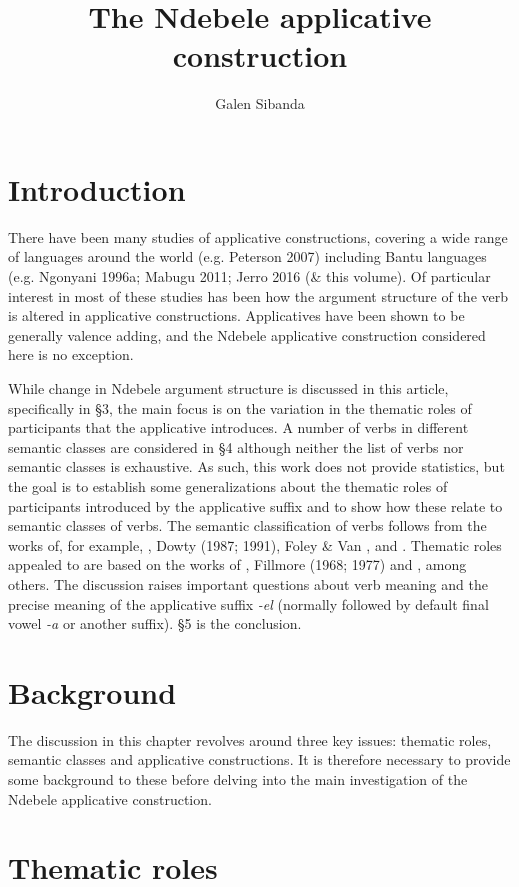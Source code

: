 \documentclass[output=paper]{langsci/langscibook}
\title{The Ndebele applicative construction}
\author{%
 Galen Sibanda \affiliation{Michigan State University} 
}
\begin{document}
\section {Introduction}

There have been many studies of applicative constructions, covering a wide range of languages around the world (e.g. Peterson 2007) including Bantu languages (e.g. Ngonyani 1996a; Mabugu 2011; Jerro 2016 (\& this volume). Of particular interest in most of these studies has been how the argument structure of the verb is altered in applicative constructions. Applicatives have been shown to be generally valence adding, and the Ndebele applicative construction considered here is no exception. 

 While change in Ndebele argument structure is discussed in this article, specifically in §3, the main focus is on the variation in the thematic roles of participants that the applicative introduces. A number of verbs in different semantic classes are considered in §4 although neither the list of verbs nor semantic classes is exhaustive. As such, this work does not provide statistics, but the goal is to establish some generalizations about the thematic roles of participants introduced by the applicative suffix and to show how these relate to semantic classes of verbs. The semantic classification of verbs follows from the works of, for example, \citet{Chafe1970}, Dowty (1987; 1991), Foley \& Van \citet{Valin1984}, and \citet{Payne1997}. Thematic roles appealed to are based on the works of \citet{Frawley1992}, Fillmore (1968; 1977) and \citet{Halliday1970}, among others. The discussion raises important questions about verb meaning and the precise meaning of the applicative suffix \textit{-el }(normally followed by default final vowel \textit{-a} or another suffix). §5 is the conclusion.

\section {Background}

The discussion in this chapter revolves around three key issues: thematic roles, semantic classes and applicative constructions. It is therefore necessary to provide some background to these before delving into the main investigation of the Ndebele applicative construction. 

\section{Thematic roles}
\end{document}
